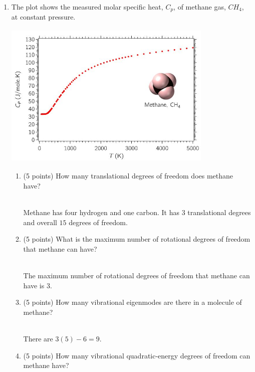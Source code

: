 \documentclass[fleqn]{article}
\begin{document}
\begin{enumerate}
    \pagebreak
    
    \item The plot shows the measured molar specific heat, $C_p$, of methane gas, $CH_4$, at constant pressure.
    \begin{center}
      \includegraphics[height=7cm, width=10cm]{question4.JPG}
    \end{center}
    \begin{enumerate}
      \item (5 points) How many translational degrees of freedom does methane have?

        \textcolor{hwColor}{
          \\
          Methane has four hydrogen and one carbon. It has $3$ translational degrees and overall $15$
          degrees of freedom.
          \\
        }

      \item (5 points) What is the maximum number of rotational degrees of freedom that methane can
      have?

        \textcolor{hwColor}{
          \\
          The maximum number of rotational degrees of freedom that methane can
          have is $3$.
          \\
        }

      \item (5 points) How many vibrational eigenmodes are there in a molecule of methane?

        \textcolor{hwColor}{
          \\
          There are $3(5)-6=9$.
          \\
        }

      \item (5 points) How many vibrational quadratic-energy degrees of freedom can methane have?


\end{enumerate}
\end{enumerate}
\end{document}

